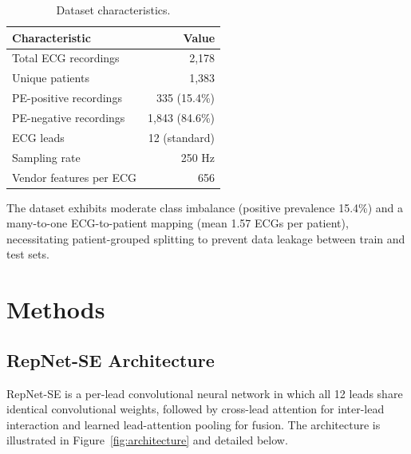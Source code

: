 \documentclass[11pt,a4paper]{article}
\begin{document}
\begin{table}[H]
\centering
\caption{Dataset characteristics.}
\label{tab:dataset}
\begin{tabular}{lr}
\toprule
\textbf{Characteristic} & \textbf{Value} \\
\midrule
Total ECG recordings & 2,178 \\
Unique patients & 1,383 \\
PE-positive recordings & 335 (15.4\%) \\
PE-negative recordings & 1,843 (84.6\%) \\
ECG leads & 12 (standard) \\
Sampling rate & 250 Hz \\
Vendor features per ECG & 656 \\
\bottomrule
\end{tabular}
\end{table}

The dataset exhibits moderate class imbalance (positive prevalence 15.4\%) and a many-to-one ECG-to-patient mapping (mean 1.57 ECGs per patient), necessitating patient-grouped splitting to prevent data leakage between train and test sets.


\section{Methods}
\label{sec:methods}

\subsection{RepNet-SE Architecture}
\label{sec:arch}

RepNet-SE is a per-lead convolutional neural network in which all 12 leads share identical convolutional weights, followed by cross-lead attention for inter-lead interaction and learned lead-attention pooling for fusion. The architecture is illustrated in Figure~\ref{fig:architecture} and detailed below.
\end{document}
